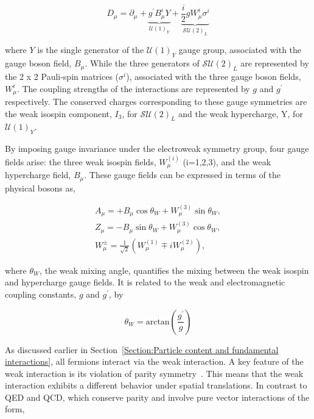 \begin{equation}
    D_\mu = \partial_\mu + \underbrace{g^{\prime}B^i_\mu Y}_{\mathcal{U}(1)_Y} + \underbrace{\frac{i}{2}gW^i_\mu\sigma^i}_{\mathcal{SU}(2)_L}
\end{equation}

where $Y$ is the single generator of the $\mathcal{U}(1)_Y$ gauge group, associated with the gauge boson field, $B_\mu$. While the three generators of $\mathcal{SU}(2)_L$ are represented by the 2 x 2 Pauli-spin matrices ($\sigma^i$), associated with the three gauge boson fields, $W^i_\mu$. The coupling strengths of the interactions are represented by $g$ and $g^{\prime}$ respectively. The conserved charges corresponding to these gauge symmetries are the weak isospin component, $I_3$, for $\mathcal{SU}(2)_L$ and the weak hypercharge, Y, for $\mathcal{U}(1)_Y$.

By imposing gauge invariance under the electroweak symmetry group, four gauge fields arise: the three weak isospin fields, $W_{\mu}^{(i)}$ (i=1,2,3), and the weak hypercharge field, $B_{\mu}$. These gauge fields can be expressed in terms of the physical bosons as,

\begin{equation}
\begin{array}{c}
A_{\mu} = + B_{\mu} \cos{\theta_{W}} + W_{\mu}^{(3)} \sin{\theta_{W}}, \\
Z_{\mu} = - B_{\mu} \sin{\theta_{W}} + W_{\mu}^{(3)} \cos{\theta_{W}}, \\
W_{\mu}^{\pm} = \frac{1}{\sqrt{2}} (W_{\mu}^{(1)} \mp iW_{\mu}^{(2)}),
\end{array}
\label{Equation:Introduction_PhysicalGaugeFields}
\end{equation}

where $\theta_{W}$, the weak mixing angle, quantifies the mixing between the weak isospin and hypercharge gauge fields. It is related to the weak and electromagnetic coupling constants, $g$ and $g^{\prime}$, by

\begin{equation}
    \theta_W = \text{arctan}(\frac{g^{\prime}}{g})
\end{equation}

As discussed earlier in Section~\ref{Section:Particle content and fundamental interactions}, all fermions interact via the weak interaction. A key feature of the weak interaction is its violation of parity symmetry~\cite{ParityViolation_Wu}. This means that the weak interaction exhibits a different behavior under spatial translations. In contrast to QED and QCD, which conserve parity and involve pure vector interactions of the form,

